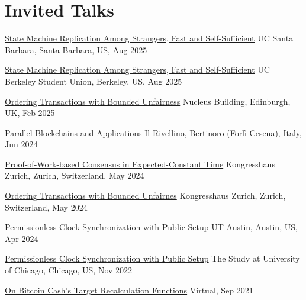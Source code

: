 \section{Invited Talks}

{\href{https://crypto.iacr.org/2025/program.php}{State Machine Replication Among Strangers, Fast and Self-Sufficient}}
{}
{}
{}
{UC Santa Barbara, Santa Barbara, US, Aug 2025}

{\href{https://youtu.be/CkU-Wz0YOuY?t=8010}{State Machine Replication Among Strangers, Fast and Self-Sufficient}}
{}
{}
{}
{UC Berkeley Student Union, Berkeley, US, Aug 2025}

{\href{https://typesig.pl/tuples2025/}{Ordering Transactions with Bounded Unfairness}}
{}
{}
{}
{Nucleus Building, Edinburgh, UK, Feb 2025}

{\href{https://cibe24.bici.events/home}{Parallel Blockchains and Applications}}
{}
{}
{}
{Il Rivellino, Bertinoro (Forlì-Cesena), Italy, Jun 2024}

{\href{https://youtu.be/uvAEvkGZymg?t=2400}{Proof-of-Work-based Consensus in Expected-Constant Time}}
{}
{}
{}
{Kongresshaus Zurich, Zurich, Switzerland, May 2024}

{\href{https://youtu.be/uvAEvkGZymg}{Ordering Transactions with Bounded Unfairnes}}
{}
{}
{}
{Kongresshaus Zurich, Zurich, Switzerland, May 2024}

{\href{https://texascryptoday.github.io/events/2-UTAustin.html}{Permissionless Clock Synchronization with Public Setup}}
{}
{}
{}
{UT Austin, Austin, US, Apr 2024}

{\href{https://youtu.be/JUYzY-1mcYM}{Permissionless Clock Synchronization with Public Setup}}
{}
{}
{}
{The Study at University of Chicago, Chicago, US, Nov 2022}

{{\href{https://youtu.be/5K6HNCtLPtk}{On Bitcoin Cash's Target Recalculation Functions}}}
{}
{}
{}
{Virtual, Sep 2021}